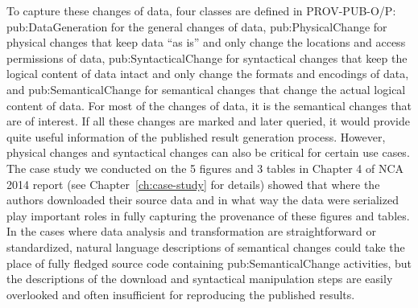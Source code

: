 To capture these changes of data, four classes are defined in PROV-PUB-O/P: pub:DataGeneration for the general changes of data, pub:PhysicalChange for physical changes that keep data ``as is'' and only change the locations and access permissions of data, pub:SyntacticalChange for syntactical changes that keep the logical content of data intact and only change the formats and encodings of data, and pub:SemanticalChange for semantical changes that change the actual logical content of data. For most of the changes of data, it is the semantical changes that are of interest. If all these changes are marked and later queried, it would provide quite useful information of the published result generation process. However, physical changes and syntactical changes can also be critical for certain use cases. The case study we conducted on the 5 figures and 3 tables in Chapter 4 of NCA 2014 report (see Chapter~\ref{ch:case-study} for details) showed that where the authors downloaded their source data and in what way the data were serialized play important roles in fully capturing the provenance of these figures and tables. In the cases where data analysis and transformation are straightforward or standardized, natural language descriptions of semantical changes could take the place of fully fledged source code containing pub:SemanticalChange activities, but the descriptions of the download and syntactical manipulation steps are easily overlooked and often insufficient for reproducing the published results. 



